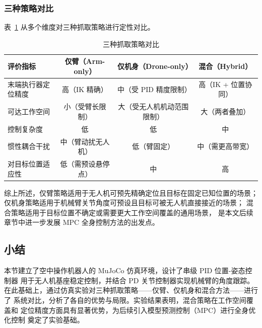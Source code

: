\subsubsection{三种策略对比}

表~\ref{tab:grasp_compare} 从多个维度对三种抓取策略进行定性对比。

\begin{table}[h]
\centering
\caption{三种抓取策略对比}
\label{tab:grasp_compare}
\begin{tabular}{lccc}
\hline
\textbf{评价指标} & \textbf{仅臂（Arm-only）} & \textbf{仅机身（Drone-only）} & \textbf{混合（Hybrid）} \\
\hline
末端执行器定位精度   & 高（IK 精确）        & 中（受 PID 精度限制）    & 高（IK + 位置协同） \\
可达工作空间         & 小（受臂长限制）     & 大（受无人机机动范围限制）& 大（两者叠加）       \\
控制复杂度           & 低                   & 低                        & 中                   \\
惯性耦合干扰         & 中（臂动扰无人机）   & 低（臂固定）              & 中（需更高带宽）     \\
对目标位置适应性     & 低（需预设悬停点）   & 中                        & 高                   \\
\hline
\end{tabular}
\end{table}

综上所述，仅臂策略适用于无人机可预先精确定位且目标在固定已知位置的场景；
仅机身策略适用于机械臂关节角度可预设且目标可被无人机直接接近的场景；
混合策略适用于目标位置不确定或需要更大工作空间覆盖的通用场景，
是本文后续章节中进一步发展 MPC 全身控制方法的出发点。

\subsection{小结}

本节建立了空中操作机器人的 MuJoCo 仿真环境，设计了串级 PID 位置-姿态控制器
用于无人机基座稳定控制，并结合 PD 关节控制器实现机械臂的角度跟踪。
在此基础上，通过仿真实验对三种抓取策略——仅臂、仅机身和混合方法——进行了
系统对比，分析了各自的优势与局限。实验结果表明，混合策略在工作空间覆盖和
定位精度方面具有显著优势，为后续引入模型预测控制（MPC）进行全身优化控制
奠定了实验基础。
